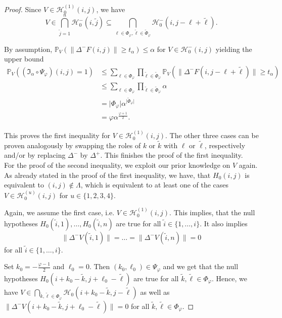 \documentclass[a4paper,12pt]{article}
\newcommand{\abs}[1]{\lvert#1\rvert}
\newcommand{\norm}[1]{\lVert#1\rVert}
\theoremstyle{plain}
\theoremstyle{definition}
\begin{document}
\begin{proof}
	Since $V \in \mathcal{H}_0^{(1)}(i, j)$, we have
	\begin{equation*}
		V \in \bigcap_{\tilde{j} = 1}^n \mathcal{H}_0^-(i, \tilde{j}) \subseteq \bigcap_{\ell \in \Phi_\varphi, \tilde{\ell} \in \tilde{\Phi}_\varphi} \mathcal{H}_0^-(i, j - \ell + \tilde{\ell}).
	\end{equation*}
	
	By assumption, $\mathbb{P}_V\left( \norm{\Delta^- F(i, j)} \geq t_\alpha \right) \leq \alpha$ for $V \in \mathcal{H}_0^-(i, j)$ yielding the upper bound
	\begin{align*}
		\mathbb{P}_V\left( (\mathfrak{I}_\alpha \circ \Psi_\varphi)(i, j) = 1 \right) &\leq \sum_{\ell \in \Phi_\varphi} \prod_{\tilde{\ell} \in \tilde{\Phi}_\varphi} \mathbb{P}_V\left( \norm{\Delta^- F(i, j - \ell + \tilde{\ell})} \geq t_\alpha \right) \\
		&\leq \sum_{\ell \in \Phi_\varphi} \prod_{\tilde{\ell} \in \tilde{\Phi}_\varphi} \alpha \\
		&= \abs{\Phi_\varphi} \alpha^{\abs{\tilde{\Phi}_\varphi}} \\
		&= \varphi \alpha^{\frac{\varphi + 1}{2}}.
	\end{align*}
	
	This proves the first inequality for $V \in \mathcal{H}_0^{(1)}(i, j)$. The other three cases can be proven analogously by swapping the roles of $k$ or $\tilde{k}$ with $\ell$ or $\tilde{\ell}$, respectively and/or by replacing $\Delta^-$ by $\Delta^+$. This finishes the proof of the first inequality.\\
	
	
	For the proof of the second inequality, we exploit our prior knowledge on $V$ again. As already stated in the proof of the first inequality, we have, that $H_0(i, j)$ is equivalent to $(i, j) \notin \varLambda$, which is equivalent to at least one of the cases $V \in \mathcal{H}_0^{(u)}(i, j)$ for $u \in \{ 1, 2, 3, 4 \}$.
	
	Again, we assume the first case, i.e. $V \in \mathcal{H}_0^{(1)}(i, j)$. This implies, that the null hypotheses $H_0(\tilde{i}, 1), \ldots, H_0(\tilde{i}, n)$ are true for all $\tilde{i} \in \{ 1, \dots, i \}$. It also implies
	\begin{equation*}
		\norm{\Delta^- V(\tilde{i}, 1)} = \ldots = \norm{\Delta^- V(\tilde{i}, n)} = 0
	\end{equation*}
	for all $\tilde{i} \in \{ 1, \dots, i \}$.
	
	Set $k_0 = -\frac{\varphi - 1}{2}$ and $\ell_0 = 0$. Then $(k_0, \ell_0) \in \Psi_\varphi$ and we get that the null hypotheses $H_0(i + k_0 - \tilde{k}, j + \ell_0 - \tilde{\ell})$ are true for all $\tilde{k}, \tilde{\ell} \in \Phi_\varphi$. Hence, we have $V \in \bigcap_{\tilde{k}, \tilde{\ell} \in \Phi_\varphi} \mathcal{H}_0(i + k_0 - \tilde{k}, j - \tilde{\ell})$ as well as $\norm{\Delta^- V(i + k_0 - \tilde{k}, j + \ell_0 - \tilde{\ell})} = 0$ for all $\tilde{k}, \tilde{\ell} \in \Phi_\varphi$.
	

\end{proof}
\end{document}
